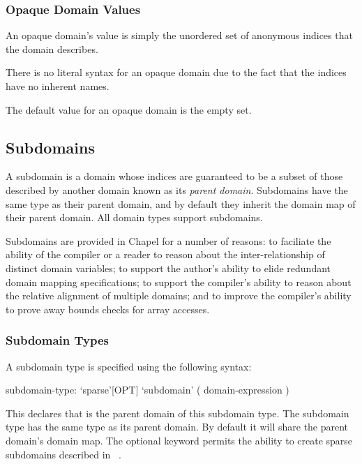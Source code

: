 \subsubsection{Opaque Domain Values}
\label{Opaque_Domain_Values}

An opaque domain's value is simply the unordered set of anonymous
indices that the domain describes.


There is no literal syntax for an opaque domain due to the fact that
the indices have no inherent names.


The default value for an opaque domain is the empty set.


\subsection{Subdomains}
\label{Subdomains}

A subdomain is a domain whose indices are guaranteed to be a subset of
those described by another domain known as its \emph{parent domain}.
Subdomains have the same type as their parent domain, and by default
they inherit the domain map of their parent domain.  All domain types
support subdomains.

\begin{rationale}
Subdomains are provided in Chapel for a number of reasons: to
faciliate the ability of the compiler or a reader to reason about the
inter-relationship of distinct domain variables; to support the
author's ability to elide redundant domain mapping specifications; to
support the compiler's ability to reason about the relative alignment
of multiple domains; and to improve the compiler's ability to prove
away bounds checks for array accesses.
\end{rationale}

\subsubsection{Subdomain Types}
\label{Subdomain_Types}

A subdomain type is specified using the following syntax:
\begin{syntax}
subdomain-type:
  `sparse'[OPT] `subdomain' ( domain-expression )
\end{syntax}
This declares that  is the parent domain of
this subdomain type.  The subdomain type has the same type as its
parent domain.  By default it will share the parent domain's domain
map.  The optional  keyword permits the ability to
create sparse subdomains described in ~.

